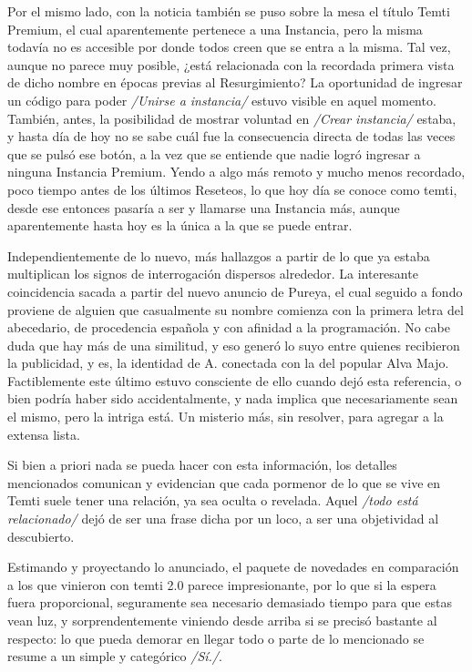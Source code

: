 \documentclass[
]{book}
\begin{document}
Por el mismo lado, con la noticia también se puso sobre la mesa el título Temti Premium, el cual aparentemente pertenece a una Instancia, pero la misma todavía no es accesible por donde todos creen que se entra a la misma. Tal vez, aunque no parece muy posible, ¿está relacionada con la recordada primera vista de dicho nombre en épocas previas al Resurgimiento? La oportunidad de ingresar un código para poder \emph{/Unirse a instancia/} estuvo visible en aquel momento. También, antes, la posibilidad de mostrar voluntad en \emph{/Crear instancia/} estaba, y hasta día de hoy no se sabe cuál fue la consecuencia directa de todas las veces que se pulsó ese botón, a la vez que se entiende que nadie logró ingresar a ninguna Instancia Premium. Yendo a algo más remoto y mucho menos recordado, poco tiempo antes de los últimos Reseteos, lo que hoy día se conoce como temti, desde ese entonces pasaría a ser y llamarse una Instancia más, aunque aparentemente hasta hoy es la única a la que se puede entrar.

Independientemente de lo nuevo, más hallazgos a partir de lo que ya estaba multiplican los signos de interrogación dispersos alrededor. La interesante coincidencia sacada a partir del nuevo anuncio de Pureya, el cual seguido a fondo proviene de alguien que casualmente su nombre comienza con la primera letra del abecedario, de procedencia española y con afinidad a la programación. No cabe duda que hay más de una similitud, y eso generó lo suyo entre quienes recibieron la publicidad, y es, la identidad de A. conectada con la del popular Alva Majo. Factiblemente este último estuvo consciente de ello cuando dejó esta referencia, o bien podría haber sido accidentalmente, y nada implica que necesariamente sean el mismo, pero la intriga está. Un misterio más, sin resolver, para agregar a la extensa lista.

Si bien a priori nada se pueda hacer con esta información, los detalles mencionados comunican y evidencian que cada pormenor de lo que se vive en Temti suele tener una relación, ya sea oculta o revelada. Aquel \emph{/todo está relacionado/} dejó de ser una frase dicha por un loco, a ser una objetividad al descubierto.

Estimando y proyectando lo anunciado, el paquete de novedades en comparación a los que vinieron con temti 2.0 parece impresionante, por lo que si la espera fuera proporcional, seguramente sea necesario demasiado tiempo para que estas vean luz, y sorprendentemente viniendo desde arriba si se precisó bastante al respecto: lo que pueda demorar en llegar todo o parte de lo mencionado se resume a un simple y categórico \emph{/Sí./}.
\end{document}
